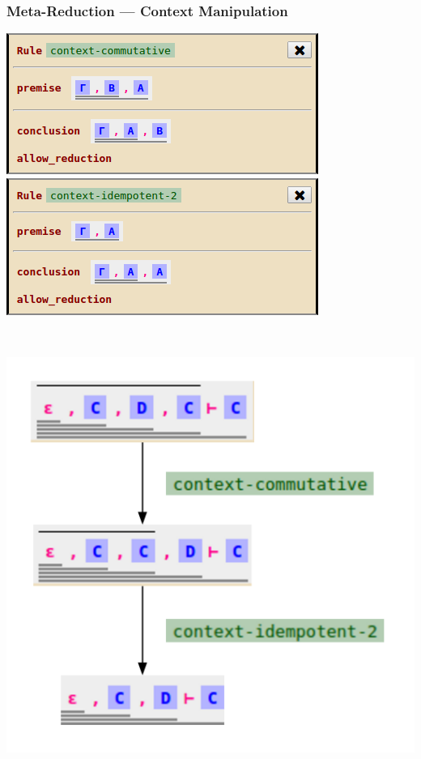 \documentclass[notes]{beamer}
\begin{document}
\begin{frame}
  \frametitle{Meta-Reduction --- Context Manipulation}

\begin{adjustwidth}{1em}{0em}
\begin{minipage}{0.50\textwidth}
\begin{flushleft}
\includegraphics[width=\textwidth]{prop-context-comm}\\
\includegraphics[width=\textwidth]{prop-context-idem-2}
\end{flushleft}
\end{minipage}
~
\begin{minipage}{0.40\textwidth}
\begin{flushright}
\includegraphics[width=\textwidth]{demo-meta-red}

\end{flushright}
\end{minipage}
\end{adjustwidth}
\end{frame}
\end{document}
